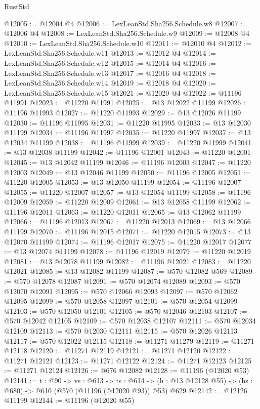 \begin{lexlean}{RustStd}
\begin{coremodule}
@12005 := @12004 @4
@12006 := LexLeanStd.Sha256.Schedule.w8
@12007 := @12006 @4
@12008 := LexLeanStd.Sha256.Schedule.w9
@12009 := @12008 @4
@12010 := LexLeanStd.Sha256.Schedule.w10
@12011 := @12010 @4
@12012 := LexLeanStd.Sha256.Schedule.w11
@12013 := @12012 @4
@12014 := LexLeanStd.Sha256.Schedule.w12
@12015 := @12014 @4
@12016 := LexLeanStd.Sha256.Schedule.w13
@12017 := @12016 @4
@12018 := LexLeanStd.Sha256.Schedule.w14
@12019 := @12018 @4
@12020 := LexLeanStd.Sha256.Schedule.w15
@12021 := @12020 @4
@12022 := @11196 @11991
@12023 := @11220 @11991
@12025 := @13 @12022 @11199
@12026 := @11196 @11993
@12027 := @11220 @11993
@12029 := @13 @12026 @11199
@12030 := @11196 @11995
@12031 := @11220 @11995
@12033 := @13 @12030 @11199
@12034 := @11196 @11997
@12035 := @11220 @11997
@12037 := @13 @12034 @11199
@12038 := @11196 @11999
@12039 := @11220 @11999
@12041 := @13 @12038 @11199
@12042 := @11196 @12001
@12043 := @11220 @12001
@12045 := @13 @12042 @11199
@12046 := @11196 @12003
@12047 := @11220 @12003
@12049 := @13 @12046 @11199
@12050 := @11196 @12005
@12051 := @11220 @12005
@12053 := @13 @12050 @11199
@12054 := @11196 @12007
@12055 := @11220 @12007
@12057 := @13 @12054 @11199
@12058 := @11196 @12009
@12059 := @11220 @12009
@12061 := @13 @12058 @11199
@12062 := @11196 @12011
@12063 := @11220 @12011
@12065 := @13 @12062 @11199
@12066 := @11196 @12013
@12067 := @11220 @12013
@12069 := @13 @12066 @11199
@12070 := @11196 @12015
@12071 := @11220 @12015
@12073 := @13 @12070 @11199
@12074 := @11196 @12017
@12075 := @11220 @12017
@12077 := @13 @12074 @11199
@12078 := @11196 @12019
@12079 := @11220 @12019
@12081 := @13 @12078 @11199
@12082 := @11196 @12021
@12083 := @11220 @12021
@12085 := @13 @12082 @11199
@12087 := @570 @12082 @569
@12089 := @570 @12078 @12087
@12091 := @570 @12074 @12089
@12093 := @570 @12070 @12091
@12095 := @570 @12066 @12093
@12097 := @570 @12062 @12095
@12099 := @570 @12058 @12097
@12101 := @570 @12054 @12099
@12103 := @570 @12050 @12101
@12105 := @570 @12046 @12103
@12107 := @570 @12042 @12105
@12109 := @570 @12038 @12107
@12111 := @570 @12034 @12109
@12113 := @570 @12030 @12111
@12115 := @570 @12026 @12113
@12117 := @570 @12022 @12115
@12118 := @11271 @11279
@12119 := @11271 @12118
@12120 := @11271 @12119
@12121 := @11271 @12120
@12122 := @11271 @12121
@12123 := @11271 @12122
@12124 := @11271 @12123
@12125 := @11271 @12124
@12126 := @676 @12082
@12128 := @11196 (@12020 @53)
@12141 := {t : @90} ->
  {vs : @613} ->
  {ts : @614} -> (h : @13 @12128 @55) -> (hs : @680) -> @610 (@570 (@11196 (@12020 @93)) @53) @629
@12142 := @12126 @11199
@12144 := @11196 (@12020 @55)

\end{coremodule}
\end{lexlean}
